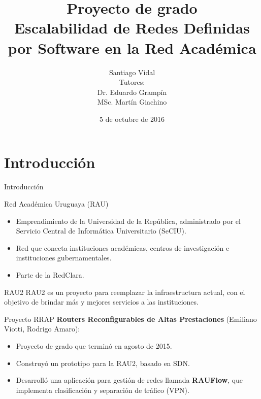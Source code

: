 \documentclass[xcolor=svgnames]{beamer}
\title
	[Escalabilidad de SDN en la RAU]
  {Proyecto de grado \\
  	Escalabilidad de Redes Definidas por Software en la Red Académica}
\author
	[Santiago Vidal]
  {Santiago Vidal \\
  	\vspace{4mm}
  	{\normalfont\small Tutores: \\
  	Dr. Eduardo Grampín \\
  	MSc. Martín Giachino}}
\date
  {5 de octubre de 2016}
\institute
  [UdelaR]
  {Instituto de Computación \\
  	Facultad de Ingeniería \\
  	Universidad de la República}
\begin{document}
\graphicspath{{Figs/}}

\maketitle

\begin{frame}{}
	\tableofcontents
\end{frame}

\section{Introducción}

\begin{frame}
	\tableofcontents[currentsection]
\end{frame}

\begin{frame}{Introducción}
	\begin{block}{Red Académica Uruguaya (RAU)}
		\begin{itemize}
			\item Emprendimiento de la Universidad de la República, administrado por el Servicio Central de Informática Universitario
			(SeCIU).
			\item Red que conecta instituciones académicas, centros de investigación e instituciones gubernamentales.
			\item Parte de la RedClara.
		\end{itemize}
	\end{block}
	\begin{block}{RAU2}
		RAU2 es un proyecto para reemplazar la infraestructura actual, con el objetivo de brindar más y mejores servicios a las instituciones.
	\end{block}
\end{frame}

\begin{frame}{Proyecto RRAP}
	\textbf{Routers Reconfigurables de Altas Prestaciones} (Emiliano Viotti, Rodrigo Amaro):
	\begin{itemize}
		\item Proyecto de grado que terminó en agosto de 2015.
		\item Construyó un prototipo para la RAU2, basado en SDN.
		\item Desarrolló una aplicación para gestión de redes llamada \textbf{RAUFlow}, que implementa clasificación y separación de tráfico (VPN).
	\end{itemize}
\end{frame}
\end{document}
